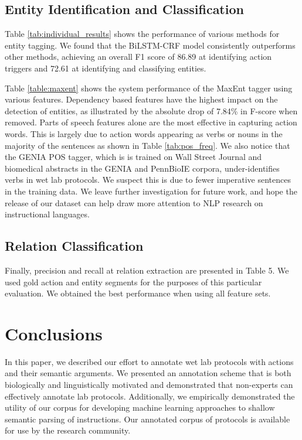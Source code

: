\documentclass[11pt,a4paper]{article}
\begin{document}
\subsection{Entity Identification and Classification}

Table \ref{tab:individual_results} shows the performance of various methods for entity tagging. We found that the BiLSTM-CRF model consistently outperforms other methods, achieving an overall F1 score of 86.89 at identifying action triggers and 72.61 at identifying and classifying entities. 
              

Table \ref{table:maxent} shows the system performance of the MaxEnt tagger using various features. Dependency based features have the highest impact on the detection of entities, as illustrated by the absolute drop of  7.84\% in F-score when removed. Parts of speech features alone are the most effective in capturing action words. This is largely  due to action words appearing as verbs or nouns in the majority of the sentences as shown in Table \ref{tab:pos_freq}. We also notice that the GENIA POS tagger, which is is trained on Wall Street Journal and biomedical abstracts in the GENIA and PennBioIE corpora, under-identifies verbs in wet lab protocols. We suspect this is due to fewer imperative sentences in the training data. We leave further investigation for future work, and hope the release of our dataset can help draw more attention to NLP research on instructional languages. 

\subsection{Relation Classification}
Finally, precision and recall at relation extraction are presented in Table 5. We used gold action and entity segments for the purposes of this particular evaluation. We obtained the best performance when using all feature sets.
              
              

\section{Conclusions}
In this paper, we described our effort to annotate wet lab protocols with actions and their semantic arguments. We presented an annotation scheme that is both biologically and linguistically motivated and demonstrated that non-experts can effectively annotate lab protocols. Additionally, we empirically demonstrated the utility of our corpus for developing machine learning approaches to shallow semantic parsing of instructions.  Our annotated corpus of protocols is available for use by the research community.
\end{document}
